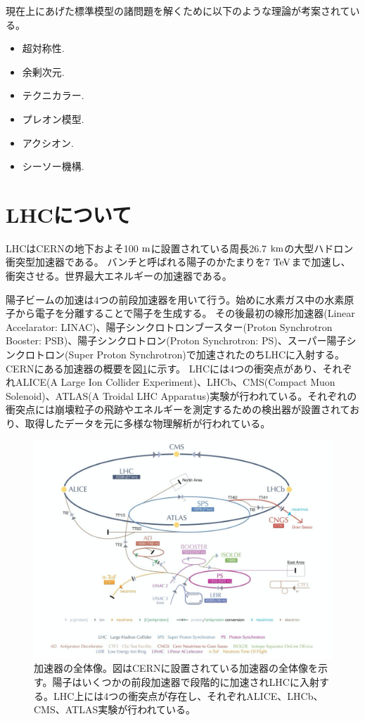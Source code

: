現在上にあげた標準模型の諸問題を解くために以下のような理論が考案されている。
\begin{itemize}
  \item 超対称性\cite{1-11}.
  \item 余剰次元.
  \item テクニカラー.
  \item プレオン模型.
  \item アクシオン.
  \item シーソー機構.
\end{itemize}

\clearpage
\section{LHCについて}
LHCはCERNの地下およそ100 $\rm{m}$に設置されている周長26.7 $\rm{km}$の大型ハドロン衝突型加速器である。
バンチと呼ばれる陽子のかたまりを7 $\rm{TeV}$まで加速し、衝突させる。世界最大エネルギーの加速器である。

陽子ビームの加速は4つの前段加速器を用いて行う。始めに水素ガス中の水素原子から電子を分離することで陽子を生成する。
その後最初の線形加速器(Linear Accelarator: LINAC)、陽子シンクロトロンブースター(Proton Synchrotron Booster: PSB)、陽子シンクロトロン(Proton Synchrotron: PS)、スーパー陽子シンクロトロン(Super Proton Synchrotron)で加速されたのちLHCに入射する。CERNにある加速器の概要を図\ref{LHC_overview}に示す。
LHCには4つの衝突点があり、それぞれALICE(A Large Ion Collider Experiment)、LHCb、CMS(Compact Muon Solenoid)、ATLAS(A
Troidal LHC Apparatus)実験が行われている。それぞれの衝突点には崩壊粒子の飛跡やエネルギーを測定するための検出器が設置されており、取得したデータを元に多様な物理解析が行われている。

\begin{figure}[bpt]\centering
\includegraphics[width=12cm]{./LHC_overview.png}
\caption[加速器の全体像]{加速器の全体像\cite{1-1}。図はCERNに設置されている加速器の全体像を示す。陽子はいくつかの前段加速器で段階的に加速されLHCに入射する。LHC上には4つの衝突点が存在し、それぞれALICE、LHCb、CMS、ATLAS実験が行われている。}
\label{LHC_overview}
\end{figure}

